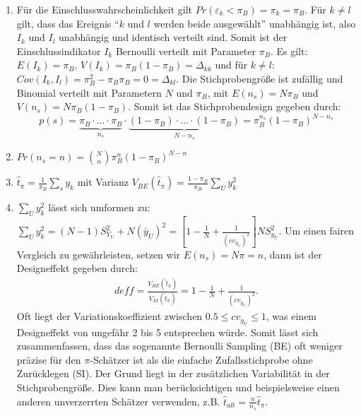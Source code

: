 \documentclass{article}
\begin{document}
\begin{solution}
\begin{enumerate}
	\item Für die Einschlusswahrscheinlichkeit gilt $Pr(\varepsilon_k<\pi_B) = \pi_k = \pi_B$. Für $k \neq l$ gilt, dass das Ereignis \enquote{$k$ und $l$ werden beide ausgewählt} unabhängig ist, also $I_k$ und $I_l$ unabhängig und identisch verteilt sind. Somit ist der Einschlussindikator $I_k$ Bernoulli verteilt mit Parameter $\pi_B$. Es gilt: $E(I_k)=\pi_B$, $V(I_k)=\pi_B(1-\pi_B) = \Delta_{kk}$ und für $k \neq l$: $Cov(I_k,I_l)=\pi_B^2-\pi_B\pi_B = 0 = \Delta_{kl}$. Die Stichprobengröße ist zufällig und Binomial verteilt mit Parametern $N$ und $\pi_B$, mit $E(n_s)=N\pi_B$ und $V(n_s)=N\pi_B(1-\pi_B)$. Somit ist das Stichprobendesign gegeben durch: $$p(s)=\underbrace{\pi_B \cdot ... \cdot \pi_B}_{n_s}\cdot \underbrace{(1-\pi_B) \cdot ... \cdot (1-\pi_B)}_{N-n_s} = \pi_B^{n_s}(1-\pi_B)^{N-n_s}$$ 
	\item $Pr(n_s = n) = \binom{N}{n}\pi_B^n(1-\pi_B)^{N-n}$
	\item $\hat{t}_\pi = \frac{1}{\pi_B}\sum_s y_k$ mit Varianz $V_{BE}(\hat{t}_\pi)= \frac{1-\pi_B}{\pi_B} \sum_U y_k^2$
	\item $\sum_U y_k^2$ lässt sich umformen zu: $\sum_U y_k^2 = (N-1)S_{Y_U}^2 + N(\bar{y}_U)^2 = \left[1-\frac{1}{N}+\frac{1}{(cv_{y_U})^2}\right]N S_{y_U}^2$. Um einen fairen Vergleich zu gewährleisten, setzen wir $E(n_s)=N\pi=n$, dann ist der Designeffekt gegeben durch:
	\begin{align*}
	deff = \frac{V_{BE}(\hat{t}_\pi)}{V_{SI}(\hat{t}_\pi)} = 1-\frac{1}{N}+\frac{1}{(cv_{y_U})^2}.
	\end{align*}
	Oft liegt der Variationskoeffizient zwischen $0.5 \leq cv_{y_U} \leq 1$, was einem Designeffekt von ungefähr 2 bis 5 entsprechen würde. Somit lässt sich zusammenfassen, dass das sogenannte Bernoulli Sampling (BE) oft weniger präzise für den $\pi$-Schätzer ist als die einfache Zufallsstichprobe ohne Zurücklegen (SI). Der Grund liegt in der zusätzlichen Variabilität in der Stichprobengröße. Dies kann man berücksichtigen und beispielsweise einen anderen unverzerrten Schätzer verwenden, z.B. $\hat{t}_{alt}=\frac{n}{n_s} \hat{t}_\pi$.
\end{enumerate}
\end{solution}
\end{document}

